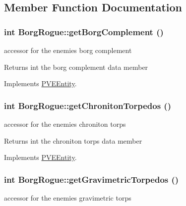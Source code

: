 \subsection{Member Function Documentation}
\hypertarget{classBorgRogue_ab48a76b7a43d96a9b7f63f5b7cdc01d7}{
\subsubsection[{getBorgComplement}]{\setlength{\rightskip}{0pt plus 5cm}int BorgRogue::getBorgComplement ()}}
\label{db/d4f/classBorgRogue_ab48a76b7a43d96a9b7f63f5b7cdc01d7}
accessor for the enemies borg complement

\begin{DoxyReturn}{Returns}
int the borg complement data member 
\end{DoxyReturn}


Implements \hyperlink{classPVEEntity}{PVEEntity}.

\hypertarget{classBorgRogue_a6403ee1ec00f94a9607a35b77b539e78}{
\subsubsection[{getChronitonTorpedos}]{\setlength{\rightskip}{0pt plus 5cm}int BorgRogue::getChronitonTorpedos ()}}
\label{db/d4f/classBorgRogue_a6403ee1ec00f94a9607a35b77b539e78}
accessor for the enemies chroniton torps

\begin{DoxyReturn}{Returns}
int the chroniton torps data member 
\end{DoxyReturn}


Implements \hyperlink{classPVEEntity}{PVEEntity}.

\hypertarget{classBorgRogue_af1d6b12ee69cdc85a2417c1b25d36f19}{
\subsubsection[{getGravimetricTorpedos}]{\setlength{\rightskip}{0pt plus 5cm}int BorgRogue::getGravimetricTorpedos ()}}
\label{db/d4f/classBorgRogue_af1d6b12ee69cdc85a2417c1b25d36f19}
accessor for the enemies gravimetric torps

